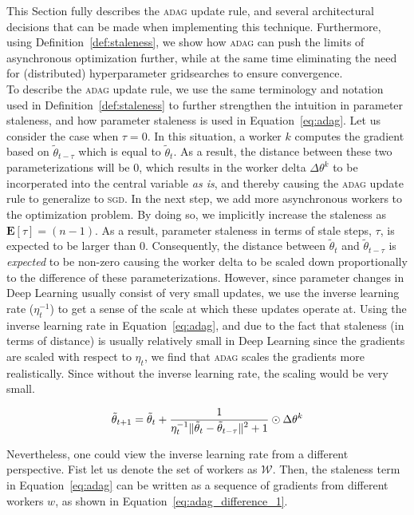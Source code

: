 This Section fully describes the \textsc{adag} update rule, and several architectural decisions that can be made when implementing this technique. Furthermore, using Definition~\ref{def:staleness}, we show how \textsc{adag} can push the limits of asynchronous optimization further, while at the same time eliminating the need for (distributed) hyperparameter gridsearches to ensure convergence.\\

To describe the \textsc{adag} update rule, we use the same terminology and notation used in Definition~\ref{def:staleness} to further strengthen the intuition in parameter staleness, and how parameter staleness is used in Equation~\ref{eq:adag}. Let us consider the case when $\tau = 0$. In this situation, a worker $k$ computes the gradient based on $\tilde{\theta}_{t-\tau}$ which is equal to $\tilde{\theta}_t$. As a result, the distance between these two parameterizations will be 0, which results in the worker delta $\Delta\theta^k$ to be incorperated into the central variable \emph{as is}, and thereby causing the \textsc{adag} update rule to generalize to \textsc{sgd}. In the next step, we add more asynchronous workers to the optimization problem. By doing so, we implicitly increase the staleness as $\mathbf{E}[\tau] = (n - 1)$. As a result, parameter staleness in terms of stale steps, $\tau$, is expected to be larger than 0. Consequently, the distance between $\tilde{\theta}_t$ and $\tilde{\theta}_{t - \tau}$ is \emph{expected} to be non-zero causing the worker delta to be scaled down proportionally to the difference of these parameterizations. However, since parameter changes in Deep Learning usually consist of very small updates, we use the inverse learning rate ($\eta_t^{-1}$) to get a sense of the scale at which these updates operate at. Using the inverse learning rate in Equation~\ref{eq:adag}, and due to the fact that staleness (in terms of distance) is usually relatively small in Deep Learning since the gradients are scaled with respect to $\eta_t$, we find that \textsc{adag} scales the gradients more realistically. Since without the inverse learning rate, the scaling would be very small.

\begin{equation}
  \label{eq:adag}
  \tilde{\theta}_{t+1} = \tilde{\theta}_t + \frac{\displaystyle 1}{\displaystyle \eta_t^{-1}\|\tilde{\theta}_t - \tilde{\theta}_{t - \tau}\|^2 + 1} \odot \Delta\theta^k
\end{equation}

Nevertheless, one could view the inverse learning rate from a different perspective. Fist let us denote the set of workers as $\mathcal{W}$. Then, the staleness term in Equation~\ref{eq:adag} can be written as a sequence of gradients from different workers $w$, as shown in Equation~\ref{eq:adag_difference_1}.

